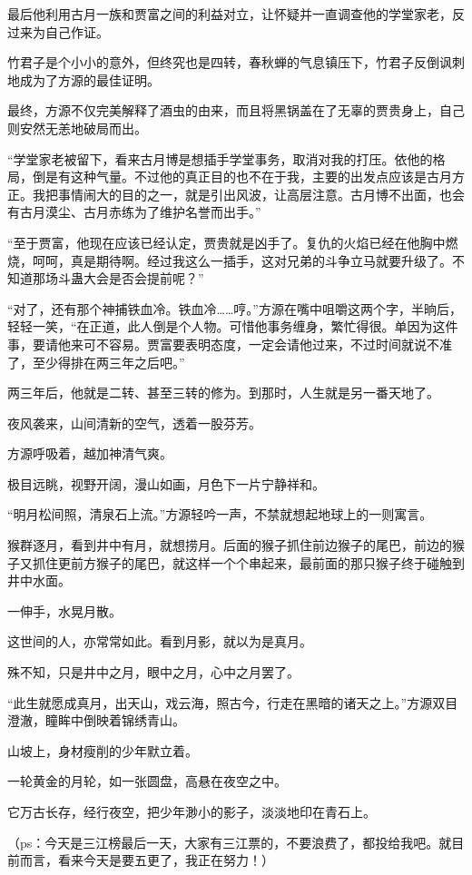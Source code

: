 \begin{this_body}
最后他利用古月一族和贾富之间的利益对立，让怀疑并一直调查他的学堂家老，反过来为自己作证。

竹君子是个小小的意外，但终究也是四转，春秋蝉的气息镇压下，竹君子反倒讽刺地成为了方源的最佳证明。

最终，方源不仅完美解释了酒虫的由来，而且将黑锅盖在了无辜的贾贵身上，自己则安然无恙地破局而出。

“学堂家老被留下，看来古月博是想插手学堂事务，取消对我的打压。依他的格局，倒是有这种气量。不过他的真正目的也不在于我，主要的出发点应该是古月方正。我把事情闹大的目的之一，就是引出风波，让高层注意。古月博不出面，也会有古月漠尘、古月赤练为了维护名誉而出手。”

“至于贾富，他现在应该已经认定，贾贵就是凶手了。复仇的火焰已经在他胸中燃烧，呵呵，真是期待啊。经过我这么一插手，这对兄弟的斗争立马就要升级了。不知道那场斗蛊大会是否会提前呢？”

“对了，还有那个神捕铁血冷。铁血冷……哼。”方源在嘴中咀嚼这两个字，半晌后，轻轻一笑，“在正道，此人倒是个人物。可惜他事务缠身，繁忙得很。单因为这件事，要请他来可不容易。贾富要表明态度，一定会请他过来，不过时间就说不准了，至少得排在两三年之后吧。”

两三年后，他就是二转、甚至三转的修为。到那时，人生就是另一番天地了。

夜风袭来，山间清新的空气，透着一股芬芳。

方源呼吸着，越加神清气爽。

极目远眺，视野开阔，漫山如画，月色下一片宁静祥和。

“明月松间照，清泉石上流。”方源轻吟一声，不禁就想起地球上的一则寓言。

猴群逐月，看到井中有月，就想捞月。后面的猴子抓住前边猴子的尾巴，前边的猴子又抓住更前方猴子的尾巴，就这样一个个串起来，最前面的那只猴子终于碰触到井中水面。

一伸手，水晃月散。

这世间的人，亦常常如此。看到月影，就以为是真月。

殊不知，只是井中之月，眼中之月，心中之月罢了。

“此生就愿成真月，出天山，戏云海，照古今，行走在黑暗的诸天之上。”方源双目澄澈，瞳眸中倒映着锦绣青山。

山坡上，身材瘦削的少年默立着。

一轮黄金的月轮，如一张圆盘，高悬在夜空之中。

它万古长存，经行夜空，把少年渺小的影子，淡淡地印在青石上。

（ps：今天是三江榜最后一天，大家有三江票的，不要浪费了，都投给我吧。就目前而言，看来今天是要五更了，我正在努力！）

\end{this_body}

